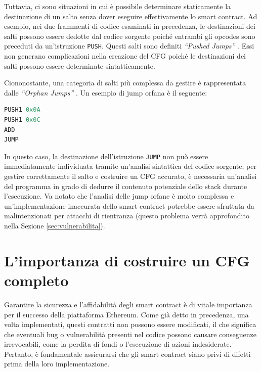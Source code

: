 Tuttavia, ci sono situazioni in cui è possibile determinare staticamente la destinazione di un salto senza dover eseguire effettivamente lo smart contract. 
Ad esempio, nei due frammenti di codice esaminati in precedenza, le destinazioni dei salti possono essere dedotte dal codice sorgente poiché entrambi gli opcodes 
sono preceduti da un’istruzione {\tt PUSH}. Questi salti sono definiti \textit{“Pushed Jumps”} \cite{pasqua2023enhancing}.
Essi non generano complicazioni nella creazione del CFG poiché le destinazioni dei salti possono essere determinate sintatticamente.

Ciononostante, una categoria di salti più complessa da gestire è rappresentata dalle \textit{“Orphan Jumps”} \cite{pasqua2023enhancing}. 
Un esempio di jump orfana è il seguente:

\begin{algorithm}[ht]
\caption{Esempio di Orphan Jump.}
\label{lst:OrphanJump}
\begin{lstlisting}[style=customsolidity, language=C, numbers=none]
PUSH1 0x0A
PUSH1 0x0C
ADD
JUMP
\end{lstlisting}
\end{algorithm}

In questo caso, la destinazione dell’istruzione {\tt JUMP} non può essere immediatamente individuata tramite un’analisi sintattica del codice sorgente; 
per gestire correttamente il salto e costruire un CFG accurato, è necessaria un’analisi del programma in grado di dedurre il contenuto potenziale dello 
stack durante l’esecuzione. Va notato che l’analisi delle jump orfane è molto complessa e un’implementazione inaccurata dello smart contract potrebbe 
essere sfruttata da malintenzionati per attacchi di rientranza (questo problema verrà approfondito nella Sezione \ref*{sec:vulnerabilita}).


\newpage
\section{L'importanza di costruire un CFG completo}\label{sec:importanzaCFG}
Garantire la sicurezza e l’affidabilità degli smart contract è di vitale importanza per il successo della piattaforma Ethereum. Come già detto in precedenza, 
una volta implementati, questi contratti non possono essere modificati, il che significa che eventuali bug o vulnerabilità presenti nel codice possono 
causare conseguenze irrevocabili, come la perdita di fondi o l'esecuzione di azioni indesiderate. Pertanto, è fondamentale assicurarsi che gli smart contract 
siano privi di difetti prima della loro implementazione. 

